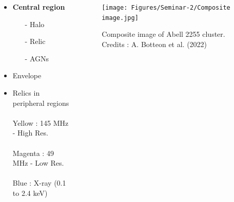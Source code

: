 \documentclass[aspectratio=169]{beamer}
\begin{document}
\begin{markdown}
\begin{frame}[plain]{}
\begin{columns}
    \begin{column}{0.3\textwidth} 
         \begin{itemize}
             \item {\textbf{Central region}}
                \begin{itemize}
                    \item[-] Halo
                    \item[-] Relic
                    \item[-] AGNs
                \end{itemize} 
             \item Envelope
             \item Relics in peripheral regions 
             \\\\ \vspace{16mm} \hspace{-4mm}
             \scriptsize{
             Yellow : 145 MHz - High Res. \\\\ \hspace{-3mm}
             Magenta : 49 MHz - Low Res.\\\\ \hspace{-3mm}
             Blue : X-ray (0.1 to 2.4 keV)}
        \end{itemize}
    \end{column}
    \begin{column}{0.8\textwidth}
         \vspace{-2mm}
          \begin{figure}[!htbp]
          \centering
          \texttt{[image: Figures/Seminar-2/Composite image.jpg]}
          \vspace*{-3mm}
          \caption{Composite image of Abell 2255 cluster. Credits :  A. Botteon et al. (2022)}
          \label{}
        \end{figure}
    \end{column}
\end{columns}

    
\end{frame}



\end{markdown}
\end{document}
